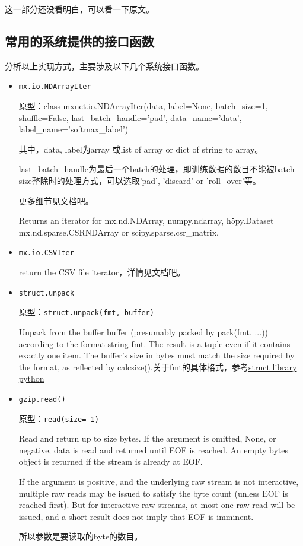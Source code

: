 这一部分还没看明白，可以看一下原文。

\subsection{常用的系统提供的接口函数}
分析以上实现方式，主要涉及以下几个系统接口函数。
\begin{itemize}
\item \verb|mx.io.NDArrayIter|

原型：class mxnet.io.NDArrayIter(data, label=None, batch\_size=1, shuffle=False, last\_batch\_handle='pad', data\_name='data', label\_name='softmax\_label')

其中，data, label为array 或list of array or dict of string to array。

last\_batch\_handle为最后一个batch的处理，即训练数据的数目不能被batch size整除时的处理方式，可以选取'pad', 'discard' or 'roll\_over'等。

更多细节见文档吧。

Returns an iterator for mx.nd.NDArray, numpy.ndarray, h5py.Dataset mx.nd.sparse.CSRNDArray or scipy.sparse.csr\_matrix.


\item \verb|mx.io.CSVIter|

return the CSV file iterator，详情见文档吧。

\item \verb|struct.unpack|

原型：\verb|struct.unpack(fmt, buffer)|

Unpack from the buffer buffer (presumably packed by pack(fmt, ...)) according to the format string fmt. The result is a tuple even if it contains exactly one item. The buffer’s size in bytes must match the size required by the format, as reflected by calcsize().关于fmt的具体格式，参考\href{https://docs.python.org/3/library/struct.html}{struct library python}

\item \verb|gzip.read()|

原型：\verb|read(size=-1)|

Read and return up to size bytes. If the argument is omitted, None, or negative, data is read and returned until EOF is reached. An empty bytes object is returned if the stream is already at EOF.

If the argument is positive, and the underlying raw stream is not interactive, multiple raw reads may be issued to satisfy the byte count (unless EOF is reached first). But for interactive raw streams, at most one raw read will be issued, and a short result does not imply that EOF is imminent.

所以参数是要读取的byte的数目。

\end{itemize}

